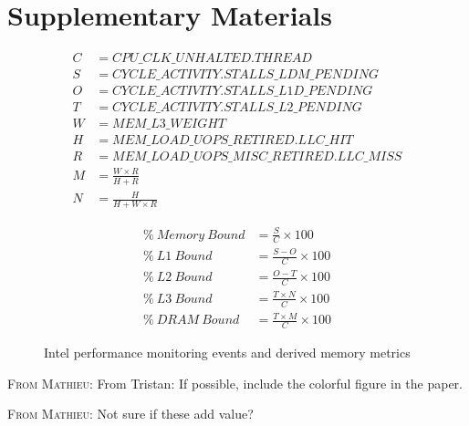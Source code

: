 \documentclass[conference]{IEEEtran}
\newcommand{\MD}[1]{\color{magenta}\textsc{From Mathieu: }#1\color{black}}
\begin{document}
\newpage
\onecolumn
\section*{Supplementary Materials}
\begin{figure}[ht]
	\noindent
	\begin{minipage}
		{0.5\textwidth}
		\begin{align*}
			C & = CPU\_CLK\_UNHALTED.THREAD                \\
			S & = CYCLE\_ACTIVITY.STALLS\_LDM\_PENDING     \\
			O & = CYCLE\_ACTIVITY.STALLS\_L1D\_PENDING     \\
			T & = CYCLE\_ACTIVITY.STALLS\_L2\_PENDING      \\
			W & = MEM\_L3\_WEIGHT                          \\
			H & = MEM\_LOAD\_UOPS\_RETIRED.LLC\_HIT        \\
			R & = MEM\_LOAD\_UOPS\_MISC\_RETIRED.LLC\_MISS \\
			M & = \frac{W \times R}{H + R}                 \\
			N & = \frac{H}{H + W \times R}                 
		\end{align*}
	\end{minipage}
	\begin{minipage}
		{0.5\textwidth}
		\begin{align}
			\%~Memory~Bound & = \frac{S}{C} \times 100          \\
			\%~L1~Bound     & = \frac{S - O}{C} \times 100      \\
			\%~L2~Bound     & = \frac{O - T}{C} \times 100      \\
			\%~L3~Bound     & = \frac{T \times N}{C} \times 100 \\
			\%~DRAM~Bound   & = \frac{T \times M}{C} \times 100 
		\end{align}
	\end{minipage}
	\caption{Intel performance monitoring events and derived memory metrics}
	\label{fig:memory-metrics}
\end{figure}

\MD{From Tristan: If possible, include the colorful figure in the paper.}

\MD{Not sure if these add value?}
\label{sec:supplementary}
\end{document}
